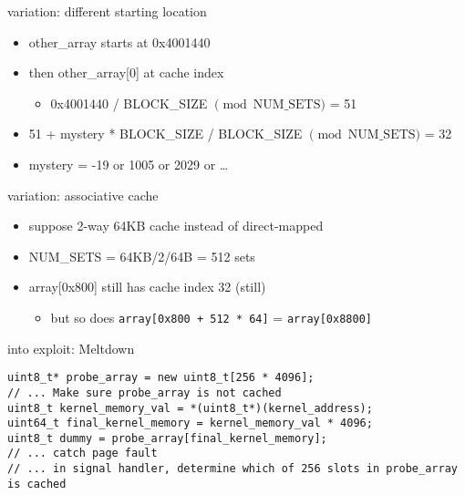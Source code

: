\begin{frame}{variation: different starting location}
    \begin{itemize}
    \item other\_array starts at 0x4001440
    \item then other\_array[0] at cache index 
        \begin{itemize}
        \item 0x4001440 / BLOCK\_SIZE $\pmod{\text{NUM\_SETS}}$ = 51
        \end{itemize}
    \item 51 + mystery * BLOCK\_SIZE / BLOCK\_SIZE $\pmod{\text{NUM\_SETS}}$ = 32
    \item mystery = -19 or 1005 or 2029 or \ldots
    \end{itemize}
\end{frame}

\begin{frame}{variation: associative cache}
    \begin{itemize}
    \item suppose 2-way 64KB cache instead of direct-mapped
    \item NUM\_SETS = 64KB/2/64B = 512 sets
    \item array[0x800] still has cache index 32 (still)
        \begin{itemize}
        \item but so does \texttt{array[0x800 + 512 * 64]} = \texttt{array[0x8800]}
        \end{itemize}
    \end{itemize}
\end{frame}

\begin{frame}[fragile]{into exploit: Meltdown}
\begin{Verbatim}
uint8_t* probe_array = new uint8_t[256 * 4096];
// ... Make sure probe_array is not cached
uint8_t kernel_memory_val = *(uint8_t*)(kernel_address);
uint64_t final_kernel_memory = kernel_memory_val * 4096;
uint8_t dummy = probe_array[final_kernel_memory];
// ... catch page fault
// ... in signal handler, determine which of 256 slots in probe_array is cached
\end{Verbatim}
\end{frame}

